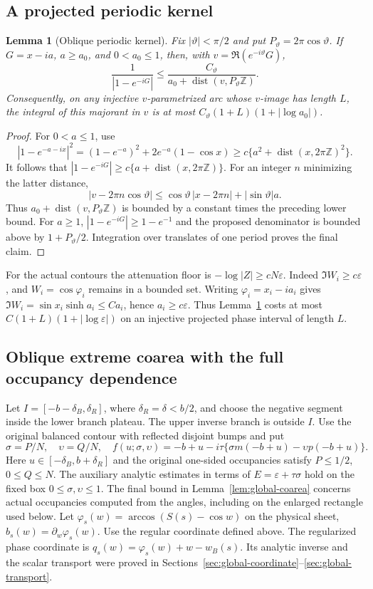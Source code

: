 \documentclass[11pt]{article}
\numberwithin{equation}{section}
\newtheorem{lemma}[theorem]{Lemma}
\theoremstyle{remark}\newtheorem{remark}[theorem]{Remark}
\begin{document}
\subsection{A projected periodic kernel}
\begin{lemma}[Oblique periodic kernel]\label{lem:oblique-kernel}
Fix $|\vartheta|<\pi/2$ and put $P_\vartheta=2\pi\cos\vartheta$.
If $G=x-ia$, $a\ge a_0$, and $0<a_0\le1$, then, with
$v=\Re(e^{-i\vartheta}G)$,
\[
 \frac1{|1-e^{-iG}|}
 \le \frac{C_\vartheta}
 {a_0+\operatorname{dist}(v,P_\vartheta\mathbb Z)}.
\]
Consequently, on any injective $v$-parametrized arc whose
$v$-image has length $L$, the integral of this majorant in $v$
is at most $C_\vartheta(1+L)(1+|\log a_0|)$.
\end{lemma}
\begin{proof}
For $0<a\le1$, use
\[
 |1-e^{-a-ix}|^2=(1-e^{-a})^2+2e^{-a}(1-\cos x)
 \ge c\{a^2+\operatorname{dist}(x,2\pi\mathbb Z)^2\}.
\]
It follows that
$|1-e^{-iG}|\ge c\{a+\operatorname{dist}(x,2\pi\mathbb Z)\}$.
For an integer $n$ minimizing the latter distance,
\[
 |v-2\pi n\cos\vartheta|
 \le\cos\vartheta\,|x-2\pi n|+|\sin\vartheta|a.
\]
Thus $a_0+\operatorname{dist}(v,P_\vartheta\mathbb Z)$ is
bounded by a constant times the preceding lower bound.
For $a\ge1$, $|1-e^{-iG}|\ge1-e^{-1}$ and the proposed
denominator is bounded above by $1+P_\vartheta/2$.
Integration over translates of one period proves the final claim.
\end{proof}


For the actual contours the attenuation floor is
$-\log|Z|\ge cN\varepsilon$. Indeed $\Im W_i\ge c\varepsilon$,
and $W_i=\cos\varphi_i$ remains in a bounded set. Writing
$\varphi_i=x_i-ia_i$ gives
$\Im W_i=\sin x_i\sinh a_i\le C a_i$, hence
$a_i\ge c\varepsilon$. Thus Lemma~\ref{lem:oblique-kernel}
costs at most $C(1+L)(1+|\log\varepsilon|)$ on an injective
projected phase interval of length $L$.

\subsection{Oblique extreme coarea with the full occupancy dependence}

Let $I=[-b-\delta_B,\delta_R]$, where $\delta_R=\delta<b/2$,
and choose the negative segment inside the lower branch plateau.
The upper inverse branch is outside $I$.  Use the original balanced
contour with reflected disjoint bumps and put
\[
 \sigma=P/N,\quad\upsilon=Q/N,\quad
 f(u;\sigma,\upsilon)
 =-b+u-i\tau\{\sigma m(-b+u)-\upsilon p(-b+u)\}.
\]
Here $u\in[-\delta_B,b+\delta_R]$ and the original one-sided
occupancies satisfy $P\le1/2$, $0\le Q\le N$.
The auxiliary analytic estimates in terms of $E=\varepsilon+\tau\sigma$
hold on the fixed box $0\le\sigma,\upsilon\le1$.
The final bound in Lemma~\ref{lem:global-coarea} concerns actual
occupancies computed from the angles, including on the enlarged
rectangle used below.
Let $\varphi_s(w)=\arccos(S(s)-\cos w)$ on the physical sheet,
$b_s(w)=\partial_w\varphi_s(w)$. Use the regular coordinate
defined above.
The regularized phase coordinate is
$q_s(w)=\varphi_s(w)+w-w_B(s)$.
Its analytic inverse and the scalar transport were proved in
Sections~\ref{sec:global-coordinate}--\ref{sec:global-transport}.
\end{document}
